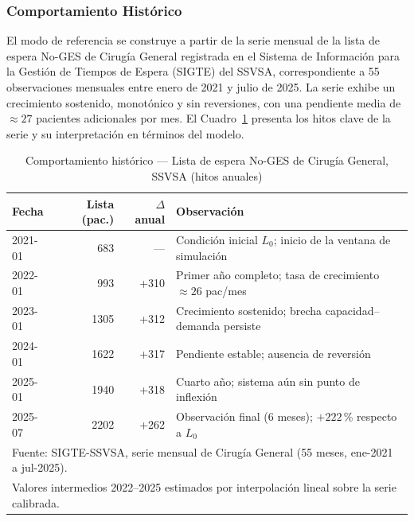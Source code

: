 \documentclass[12pt,a4paper]{article}
\begin{document}
\subsubsection*{Comportamiento Histórico}

El modo de referencia se construye a partir de la serie mensual de la lista de espera No-GES de Cirugía General registrada en el Sistema de Información para la Gestión de Tiempos de Espera (SIGTE) del SSVSA, correspondiente a 55 observaciones mensuales entre enero de 2021 y julio de 2025. La serie exhibe un crecimiento sostenido, monotónico y sin reversiones, con una pendiente media de $\approx 27$ pacientes adicionales por mes. El Cuadro~\ref{tab:historico} presenta los hitos clave de la serie y su interpretación en términos del modelo.

\begin{table}[H]
  \centering
  \caption{Comportamiento histórico — Lista de espera No-GES de Cirugía General, SSVSA (hitos anuales)}
  \label{tab:historico}
  \begin{tabular}{@{}lrrp{5.8cm}@{}}
    \toprule
    \rowcolor{azulDS!15}
    \textbf{Fecha} & \textbf{Lista (pac.)} & \textbf{$\Delta$ anual} & \textbf{Observación}                                          \\
    \midrule
    2021-01        & 683                   & ---                     & Condición inicial $L_0$; inicio de la ventana de simulación   \\[2pt]
    2022-01        & 993                   & +310                    & Primer año completo; tasa de crecimiento $\approx 26$ pac/mes \\[2pt]
    2023-01        & 1305                  & +312                    & Crecimiento sostenido; brecha capacidad--demanda persiste     \\[2pt]
    2024-01        & 1622                  & +317                    & Pendiente estable; ausencia de reversión                      \\[2pt]
    2025-01        & 1940                  & +318                    & Cuarto año; sistema aún sin punto de inflexión                \\[2pt]
    2025-07        & 2202                  & +262                    & Observación final (6 meses); $+222$\,\% respecto a $L_0$      \\
    \bottomrule
    \multicolumn{4}{l}{\footnotesize Fuente: SIGTE-SSVSA, serie mensual de Cirugía General (55 meses, ene-2021 a jul-2025).}         \\
    \multicolumn{4}{l}{\footnotesize Valores intermedios 2022--2025 estimados por interpolación lineal sobre la serie calibrada.}
  \end{tabular}
\end{table}
\end{document}
